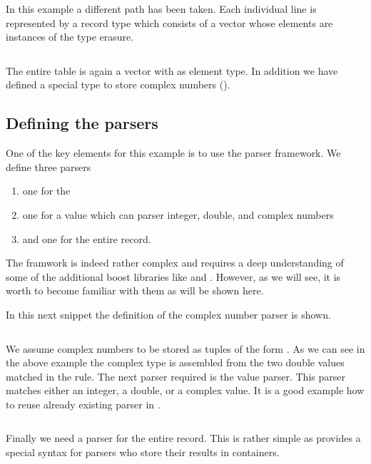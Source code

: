 In this example a different path has been taken. Each individual line is
represented by a record type which consists of a vector whose elements are
instances of the  type erasure.   
\inputminted[linenos,
             fontsize=\small,
             firstnumber=26,
             firstline=26,
             lastline=40,
             frame=lines,
             label=examples/type\_erasure\_record.cpp
             ]
{cpp}{../examples/type_erasure_record.cpp}
The entire table is again a vector with  as element type.
In addition we have defined a special type to store complex numbers
().

\subsection{Defining the parsers}

One of the key elements for this example is to use the 
parser framework. We define three parsers
\begin{enumerate}
\item one for the 
\item one for a value which can parser integer, double, and complex numbers
\item and one for the entire record.
\end{enumerate}
The  framwork is indeed rather complex and requires a deep
understanding of some of the additional boost libraries like  and
. However, as we will see, it is worth to become familiar with them
as will be shown here.

In this next snippet the definition of the complex number parser is shown. 
\inputminted[linenos,
             fontsize=\small,
             firstnumber=45,
             firstline=45,
             lastline=61,
             frame=lines,
             label=examples/type\_erasure\_record.cpp
             ]
{cpp}{../examples/type_erasure_record.cpp}
We assume complex numbers to be stored as tuples of the form . As we can see in the above example the complex type is
assembled from the two double values matched in the rule. The next parser
required is the value parser. This parser matches either an integer, a double,
or a complex value. It is a good example how to reuse already existing 
parser in . 
\inputminted[linenos,
             fontsize=\small,
             firstnumber=66,
             firstline=66,
             lastline=89,
             frame=lines,
             label=examples/type\_erasure\_record.cpp
             ]
{cpp}{../examples/type_erasure_record.cpp}
Finally we need a parser for the entire record. This is rather simple as
 provides a special syntax for parsers who store their
results in containers.
\inputminted[linenos,
             fontsize=\small,
             firstnumber=94,
             firstline=94,
             lastline=107,
             frame=lines,
             label=examples/type\_erasure\_record.cpp
             ]
{cpp}{../examples/type_erasure_record.cpp}


